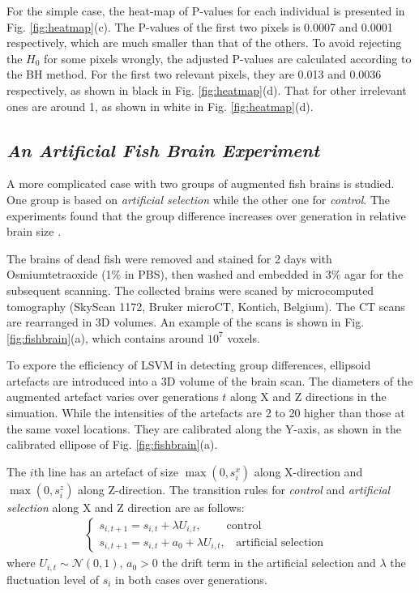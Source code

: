 \documentclass[12pt,a4paper]{article}%
\begin{document}
For the simple case, the heat-map of P-values for each individual is presented in Fig. \ref{fig:heatmap}(c).
The P-values of the first two pixels is 0.0007 and 0.0001 respectively,
which are much smaller than that of the others.
To avoid rejecting the $H_0$ for some pixels wrongly, the adjusted P-values are calculated according to the BH method.
For the first two relevant pixels, they are 0.013 and 0.0036 respectively, as shown in black in Fig. \ref{fig:heatmap}(d).
That for other irrelevant ones are around 1, as shown in white in Fig. \ref{fig:heatmap}(d).




\subsection{{\em An Artificial Fish Brain Experiment}}
A more complicated case with two groups of augmented fish brains is studied.
One group is based on {\em artificial selection} while the other one for {\em control}.
The experiments found that the group difference increases over generation in relative brain size \cite{kotrschal2013artificial, kotrschal2015larger, kotrschal2015positive}.

The brains of dead fish were removed and stained for 2 days with Osmiumtetraoxide (1\% in PBS),
then washed and embedded in 3\% agar for the subsequent scanning.
The collected brains were scaned by microcomputed
tomography (SkyScan 1172, Bruker microCT, Kontich,
Belgium).
The CT scans are rearranged in 3D volumes.
An example of the scans is shown in Fig. \ref{fig:fishbrain}(a),
which contains around $10^7$ voxels.

To expore the efficiency of LSVM in detecting group differences,
 ellipsoid artefacts are introduced into a 3D volume of the brain scan.
The diameters of the augmented artefact varies over generations $t$ along X and Z directions in the simuation.
While the intensities of the artefacts are 2 to 20 higher than those at the same voxel locations.
They are calibrated along the Y-axis, as shown in the calibrated ellipose of Fig. \ref{fig:fishbrain}(a).



The $i$th line has an artefact of size $\max(0,s_i^x)$ along X-direction
and $\max(0,s_i^z)$ along Z-direction.
The transition rules for {\em control} and {\em artificial selection} along X and Z direction are as follows:
\begin{multline}
	\begin{cases}
		s_{i,t+1} = s_{i,t}  + \lambda U_{i,t}, \ \ ~~~~~~~~\text{control} & \\
		s_{i,t+1} = s_{i,t} + a_0 + \lambda U_{i,t}, \ \ ~~\text{artificial selection}
	\end{cases}
	\label{eq.3dfishbrain}
\end{multline}
where $U_{i,t}\sim\mathcal{N}(0,1)$,  $a_0>0$ the drift term in the artificial selection and
$\lambda$ the fluctuation level of $s_i$ in both cases over generations.
\end{document}
